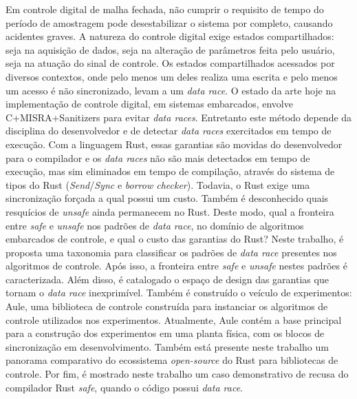 \begin{resumo}

Em controle digital de malha fechada, não cumprir o requisito de tempo do período de amostragem pode desestabilizar o sistema por completo, causando acidentes graves. A natureza do controle digital exige estados compartilhados: seja na aquisição de dados, seja na alteração de parâmetros feita pelo usuário, seja na atuação do sinal de controle. Os estados compartilhados acessados por diversos contextos, onde pelo menos um deles realiza uma escrita e pelo menos um acesso é não sincronizado, levam a um \textit{data race}. O estado da arte hoje na implementação de controle digital, em sistemas embarcados, envolve C+MISRA+Sanitizers para evitar \textit{data races}. Entretanto este método depende da disciplina do desenvolvedor e de detectar \textit{data races} exercitados em tempo de execução. Com a linguagem Rust, essas garantias são movidas do desenvolvedor para o compilador e os \textit{data races} não são mais detectados em tempo de execução, mas sim eliminados em tempo de compilação, através do sistema de tipos do Rust (\textit{Send}/\textit{Sync} e \textit{borrow checker}). Todavia, o Rust exige uma sincronização forçada a qual possui um custo. Também é desconhecido quais resquícios de \textit{unsafe} ainda permanecem no Rust. Deste modo, qual a fronteira entre \textit{safe} e \textit{unsafe} nos padrões de \textit{data race}, no domínio de algoritmos embarcados de controle, e qual o custo das garantias do Rust? Neste trabalho, é proposta uma taxonomia para classificar os padrões de \textit{data race} presentes nos algoritmos de controle. Após isso, a fronteira entre \textit{safe} e \textit{unsafe} nestes padrões é caracterizada. Além disso, é catalogado o espaço de design das garantias que tornam o \textit{data race} inexprimível. Também é construído o veículo de experimentos: Aule, uma biblioteca de controle construída para instanciar os algoritmos de controle utilizados nos experimentos. Atualmente, Aule contém a base principal para a construção dos experimentos em uma planta física, com os blocos de sincronização em desenvolvimento. Também está presente neste trabalho um panorama comparativo do ecossistema \textit{open-source} do Rust para bibliotecas de controle. Por fim, é mostrado neste trabalho um caso demonstrativo de recusa do compilador Rust \textit{safe}, quando o código possui \textit{data race}.


\end{resumo}

